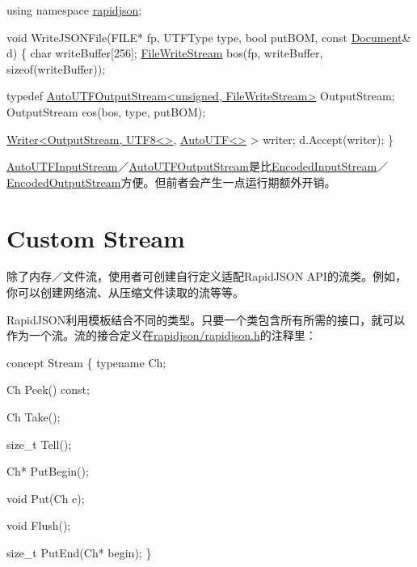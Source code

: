 \begin{DoxyCode}
\textcolor{keyword}{using namespace }\hyperlink{namespacerapidjson}{rapidjson};

\textcolor{keywordtype}{void} WriteJSONFile(FILE* fp, UTFType type, \textcolor{keywordtype}{bool} putBOM, \textcolor{keyword}{const} \hyperlink{class_generic_document}{Document}& d) \{
    \textcolor{keywordtype}{char} writeBuffer[256];
    \hyperlink{class_file_write_stream}{FileWriteStream} bos(fp, writeBuffer, \textcolor{keyword}{sizeof}(writeBuffer));

    \textcolor{keyword}{typedef} \hyperlink{class_auto_u_t_f_output_stream}{AutoUTFOutputStream<unsigned, FileWriteStream>} 
      OutputStream;
    OutputStream eos(bos, type, putBOM);

    \hyperlink{class_writer}{Writer<OutputStream, UTF8<>}, \hyperlink{struct_auto_u_t_f}{AutoUTF<>} > writer;
    d.Accept(writer);
\}
\end{DoxyCode}


{\ttfamily \hyperlink{class_auto_u_t_f_input_stream}{Auto\+U\+T\+F\+Input\+Stream}}／{\ttfamily \hyperlink{class_auto_u_t_f_output_stream}{Auto\+U\+T\+F\+Output\+Stream}}是比{\ttfamily \hyperlink{class_encoded_input_stream}{Encoded\+Input\+Stream}}／{\ttfamily \hyperlink{class_encoded_output_stream}{Encoded\+Output\+Stream}}方便。但前者会产生一点运行期额外开销。\hypertarget{md_Commun_Externe_RapidJSON_doc_stream.zh-cn_CustomStream}{}\section{Custom Stream}\label{md_Commun_Externe_RapidJSON_doc_stream.zh-cn_CustomStream}
除了内存／文件流，使用者可创建自行定义适配\+Rapid\+J\+S\+ON A\+P\+I的流类。例如，你可以创建网络流、从压缩文件读取的流等等。

Rapid\+J\+S\+O\+N利用模板结合不同的类型。只要一个类包含所有所需的接口，就可以作为一个流。流的接合定义在{\ttfamily \hyperlink{rapidjson_8h}{rapidjson/rapidjson.\+h}}的注释里：


\begin{DoxyCode}
concept Stream \{
    \textcolor{keyword}{typename} Ch;    

    Ch Peek() \textcolor{keyword}{const};

    Ch Take();

    \textcolor{keywordtype}{size\_t} Tell();

    Ch* PutBegin();

    \textcolor{keywordtype}{void} Put(Ch c);

    \textcolor{keywordtype}{void} Flush();

    \textcolor{keywordtype}{size\_t} PutEnd(Ch* begin);
\}
\end{DoxyCode}


